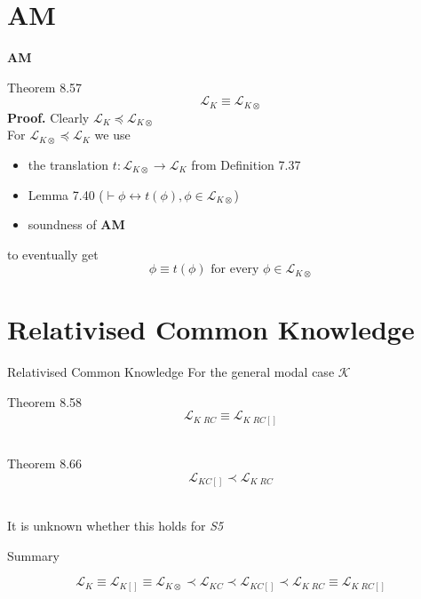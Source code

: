 \documentclass{beamer}
\newcommand{\lang}{\mathcal{L}}
\begin{document}
\section*{\textbf{AM}}

\begin{frame}{\textbf{AM}}
	\begin{block}{Theorem 8.57}
		\[\lang_K \equiv \lang_{K\otimes}\] \pause
		\textbf{Proof.} Clearly $\lang_K \preceq \lang_{K\otimes}$\\
		For $\lang_{K\otimes} \preceq \lang_K$ we use
		\begin{itemize}
			\item the translation $t: \lang_{K\otimes} \rightarrow \lang_K$ from Definition 7.37
			\item Lemma 7.40 ($\vdash \phi \leftrightarrow t(\phi), \phi \in \lang_{K\otimes}$)
			\item soundness of \textbf{AM}
		\end{itemize}
		to eventually get
		\[\phi \equiv t(\phi) \text{ for every } \phi \in \lang_{K\otimes}\]
	\end{block}
\end{frame}


\section*{Relativised Common Knowledge}

\begin{frame}{Relativised Common Knowledge}
	For the general modal case $\mathcal{K}$
	\begin{block}{Theorem 8.58}
		\[\lang_{K\;RC} \equiv \lang_{K\;RC[]}\]
		\\[10pt]
	\end{block} \pause
	\begin{block}{Theorem 8.66}
		\[\lang_{KC[]} \prec \lang_{K\;RC}\]
		\\[10pt]
	\end{block} \pause
	It is unknown whether this holds for \textit{S5}
\end{frame}

\begin{frame}{Summary}
	\begin{center}
	\end{center}
	\[\lang_K \equiv \lang_{K[]} \equiv \lang_{K\otimes} \prec \lang_{KC} \prec \lang_{KC[]} \prec \lang_{K\;RC} \equiv \lang_{K\;RC[]}\]
\end{frame}
\end{document}

